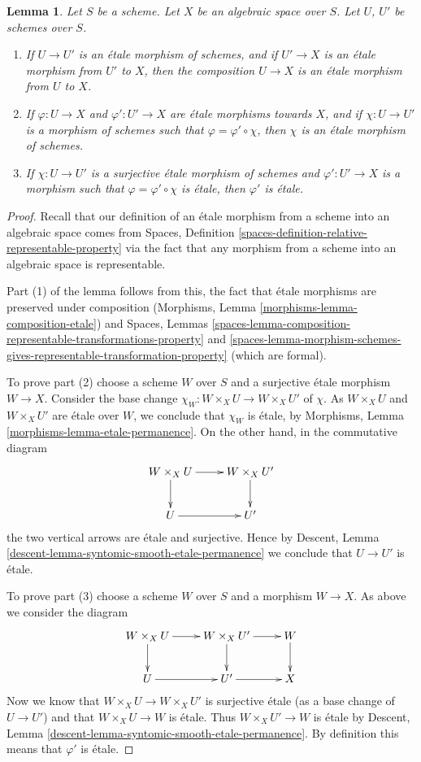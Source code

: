 \documentclass[10pt,a4paper]{amsart}
\theoremstyle{plain}
\newtheorem{lemma}[subsection]{Lemma}
\theoremstyle{definition}
\theoremstyle{remark}
\numberwithin{equation}{subsection}
\begin{document}
\begin{lemma}
\label{lemma-etale-over-space}
Let $S$ be a scheme.
Let $X$ be an algebraic space over $S$.
Let $U$, $U'$ be schemes over $S$.
\begin{enumerate}
\item If $U \to U'$ is an \'etale morphism of schemes, and
if $U' \to X$ is an \'etale morphism from $U'$ to $X$, then the
composition $U \to X$ is an \'etale morphism from $U$ to $X$.
\item If $\varphi : U \to X$ and $\varphi' : U' \to X$ are
\'etale morphisms towards $X$, and if $\chi : U \to U'$ is a
morphism of schemes such that $\varphi = \varphi' \circ \chi$,
then $\chi$ is an \'etale morphism of schemes.
\item If $\chi : U \to U'$ is a surjective \'etale morphism
of schemes and $\varphi' : U' \to X$ is a morphism such that
$\varphi = \varphi' \circ \chi$ is \'etale, then $\varphi'$
is \'etale.
\end{enumerate}
\end{lemma}

\begin{proof}
Recall that our definition of an \'etale morphism from a scheme into an
algebraic space comes from
Spaces, Definition
\ref{spaces-definition-relative-representable-property}
via the fact that any morphism from a scheme into an algebraic space
is representable.

\medskip\noindent
Part (1) of the lemma follows from this, the fact that
\'etale morphisms are preserved under composition
(Morphisms, Lemma
\ref{morphisms-lemma-composition-etale})
and
Spaces, Lemmas
\ref{spaces-lemma-composition-representable-transformations-property} and
\ref{spaces-lemma-morphism-schemes-gives-representable-transformation-property}
(which are formal).

\medskip\noindent
To prove part (2) choose a scheme $W$ over $S$ and a
surjective \'etale morphism $W \to X$. Consider the base change
$\chi_W : W \times_X U \to W \times_X U'$ of $\chi$.
As $W \times_X U$ and $W \times_X U'$ are \'etale over $W$, we conclude that
$\chi_W$ is \'etale, by
Morphisms, Lemma \ref{morphisms-lemma-etale-permanence}.
On the other hand, in the commutative diagram
$$
\xymatrix{
W \times_X U \ar[r] \ar[d] & W \times_X U' \ar[d] \\
U \ar[r] & U'
}
$$
the two vertical arrows are \'etale and surjective.
Hence by
Descent, Lemma \ref{descent-lemma-syntomic-smooth-etale-permanence}
we conclude that $U \to U'$ is \'etale.

\medskip\noindent
To prove part (3) choose a scheme $W$ over $S$ and a morphism $W \to X$.
As above we consider the diagram
$$
\xymatrix{
W \times_X U \ar[r] \ar[d] & W \times_X U' \ar[d] \ar[r] & W \ar[d] \\
U \ar[r] & U' \ar[r] & X
}
$$
Now we know that $W \times_X U \to W \times_X U'$ is surjective \'etale
(as a base change of $U \to U'$)
and that $W \times_X U \to W$ is \'etale. Thus $W \times_X U' \to W$
is \'etale by Descent, Lemma
\ref{descent-lemma-syntomic-smooth-etale-permanence}. By definition
this means that $\varphi'$ is \'etale.
\end{proof}
\end{document}
